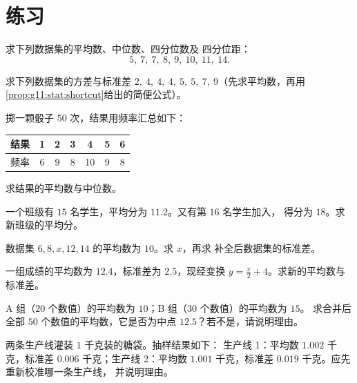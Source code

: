 \section{练习}

\begin{exercise}[$\star$]\label{exo:g11:stat:1}
求下列数据集的平均数、中位数、四分位数及
四分位距：
\[
5,\ 7,\ 7,\ 8,\ 9,\ 10,\ 11,\ 14 .
\]
\end{exercise}

\begin{exercise}[$\star$]\label{exo:g11:stat:2}
求下列数据集的方差与标准差
$2,\ 4,\ 4,\ 4,\ 5,\ 5,\ 7,\ 9$（先求平均数，再用
\cref{prop:g11:stat:shortcut}给出的简便公式）。
\end{exercise}

\begin{exercise}[$\star$]\label{exo:g11:stat:3}
掷一颗骰子 $50$ 次，结果用频率汇总如下：
\begin{center}
\begin{tabular}{c|cccccc}
结果 & 1 & 2 & 3 & 4 & 5 & 6\\
\hline
频率 & 6 & 9 & 8 & 10 & 9 & 8
\end{tabular}
\end{center}
求结果的平均数与中位数。
\end{exercise}

\begin{exercise}[$\star\star$]\label{exo:g11:stat:4}
一个班级有 $15$ 名学生，平均分为 $11.2$。又有第 $16$ 名学生加入，
得分为 $18$。求新班级的平均分。
\end{exercise}

\begin{exercise}[$\star\star$]\label{exo:g11:stat:5}
数据集 $6, 8, x, 12, 14$ 的平均数为 $10$。求 $x$，再求
补全后数据集的标准差。
\end{exercise}

\begin{exercise}[$\star$]\label{exo:g11:stat:6}
一组成绩的平均数为 $12.4$，标准差为 $2.5$，现经变换
$y = \frac{x}{2} + 4$。求新的平均数与标准差。
\end{exercise}

\begin{exercise}[$\star\star$]\label{exo:g11:stat:7}
A 组（$20$ 个数值）的平均数为 $10$；B 组（$30$ 个数值）的平均数为 $15$。
求合并后全部 $50$ 个数值的平均数，它是否为中点
$12.5$？若不是，请说明理由。
\end{exercise}

\begin{exercise}[$\star\star$]\label{exo:g11:stat:8}
两条生产线灌装 $1$ 千克装的糖袋。抽样结果如下：
生产线 1：平均数 $1.002$ 千克，标准差 $0.006$ 千克；生产线 2：平均数
$1.001$ 千克，标准差 $0.019$ 千克。应先重新校准哪一条生产线，
并说明理由。
\end{exercise}

